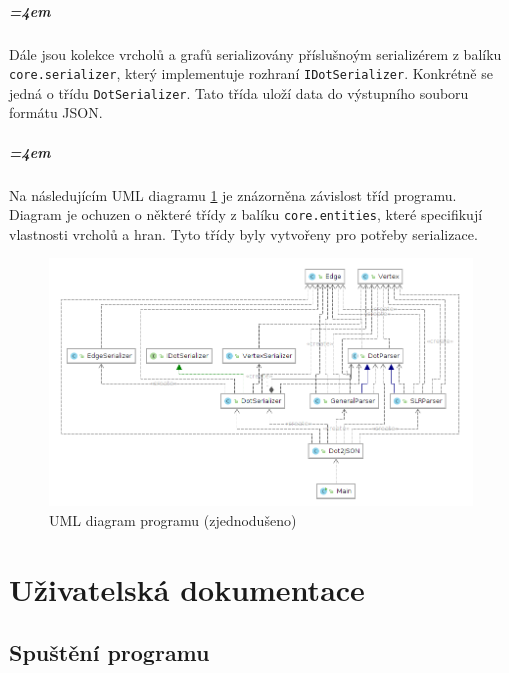 \documentclass[
12pt,
a4paper,
pdftex,
czech,
titlepage
]{report}
\begin{document}
\paragraph{\parindent=4em}{
Dále jsou kolekce vrcholů a grafů serializovány příslušnoým serializérem z balíku \texttt{core.serializer}, který implementuje rozhraní \texttt{IDotSerializer}. Konkrétně se jedná o třídu \texttt{DotSerializer}. Tato třída uloží data do výstupního souboru formátu JSON.
}

\paragraph{\parindent=4em}{
Na následujícím UML diagramu \ref{fig:uml} je znázorněna závislost tříd programu. Diagram je ochuzen o některé třídy z balíku \texttt{core.entities}, které specifikují vlastnosti vrcholů a hran. Tyto třídy byly vytvořeny pro potřeby serializace.

\begin{figure}[!h]
  \includegraphics[width=\linewidth]{uml_diagram}
  \caption{UML diagram programu (zjednodušeno)}
  \label{fig:uml}
\end{figure}
}

\chapter{Uživatelská dokumentace}
\section{Spuštění programu}
\end{document}
